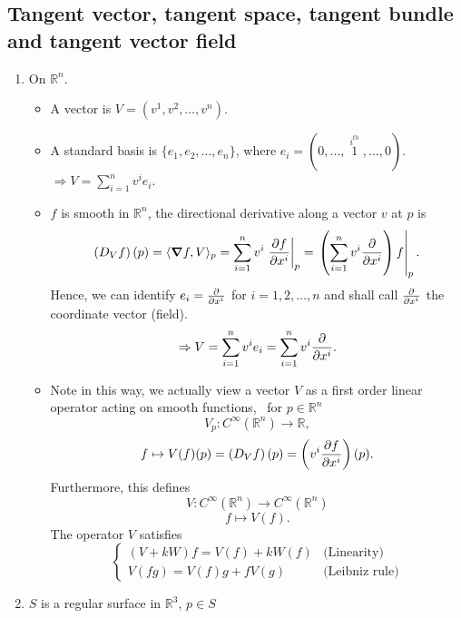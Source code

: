 \subsection*{Tangent vector, tangent space, tangent bundle and tangent vector field}
\begin{enumerate}[(1)]
    \item On \(\mathbb{R}^n\).
    \begin{itemize}
        \item A vector is \(V=(v^1,v^2,\ldots,v^n)\).
        \item A standard basis is \(\{e_1,e_2,\ldots,e_n\}\), where 
        \(e_i=(0,\ldots,\mathop{1}\limits^{i^{th}},\ldots,0)\).\\
        \(\Rightarrow V=\sum_{i=1}^n v^i e_i\).
        \item \(f\) is smooth in \(\mathbb{R}^n\), the directional 
        derivative  along a vector \(v\) at \(p\) is 
        \[
            \left(D_V f\right)(p)=\langle\grad f,V\rangle_p
                =\sum_{i=1}^n v^i\left.\pdv{f}{x^i}\right|_p  
                =\left.\left(\sum_{i=1}^n v^i\pdv{x^i}\right)f\right|_p.
        \]
        Hence, we can identify \(e_i=\pdv{x^i}\) for \(i=1,2,\ldots,n\)
        and shall call \(\pdv{x^i}\) the coordinate vector (field).
        \[
            \Rightarrow V=\sum_{i=1}^n  v^i e_i=\sum_{i=1}^n v^i\pdv
            {x^i}.   
        \]
        \item Note in this way, we actually view a vector \(V\) as a 
        first order linear operator acting on smooth functions, \ie\ 
        for \(p\in \mathbb{R}^n\)
        \[
            V_p \colon  C^\infty\left(\mathbb{R}^n\right)\to \mathbb{R}
        ,\]
        \[ 
            f\mapsto  V(f)(p)=\left(D_V f\right)(p)=\left(v^i\pdv{f}{x^i}
            \right)(p)
        .\]
         Furthermore, this defines
         \[
            V\colon C^\infty\left(\mathbb{R}^n\right)\to 
            C^\infty\left(\mathbb{R}^n\right)   
         \]
         \[
            f\mapsto V(f)   
         .\]
        The operator \(V\) satisfies
        \[
            \begin{cases}
                (V+k W)f=V(f)+kW(f)&\text{(Linearity)}\\
                V(fg)=V(f)g +f V(g)&\text{(Leibniz rule)}
            \end{cases}    
        \]
    \end{itemize}
    \item \(S\) is a regular surface in \(\mathbb{R}^3\), \(p\in S\)
    \begin{itemize}

\end{itemize}
\end{enumerate}
